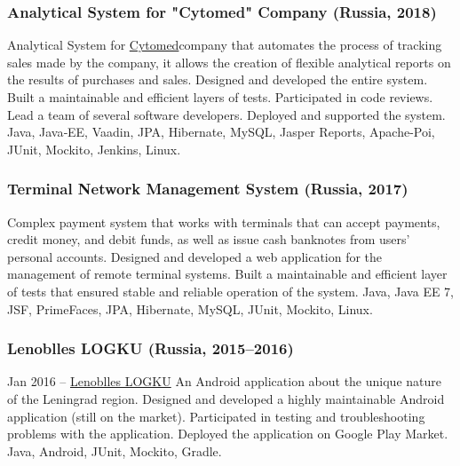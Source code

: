 \documentclass{vl}
\begin{document}
    \subsubsection*{Analytical System for "Cytomed" Company (Russia, 2018)}
    Analytical System for \href{https://cytomed.ru/en/}{Cytomed}company that automates the process of tracking sales
    made by the company, it allows the creation of flexible analytical reports on the results of purchases and sales.
    Designed and developed the entire system.
    Built a maintainable and efficient layers of tests.
    Participated in code reviews.
    Lead a team of several software developers.
    Deployed and supported the system.
    Java, Java‐EE, Vaadin, JPA, Hibernate, MySQL, Jasper Reports, Apache-Poi, JUnit, Mockito, Jenkins, Linux.

    \subsubsection*{Terminal Network Management System (Russia, 2017)}
    Complex payment system that works with terminals that can accept payments, credit money, and debit funds,
    as well as issue cash banknotes from users' personal accounts.
    Designed and developed a web application for the management of remote terminal systems.
    Built a maintainable and efficient layer of tests that ensured stable and reliable operation of the system.
    Java, Java EE 7, JSF, PrimeFaces, JPA, Hibernate, MySQL, JUnit, Mockito, Linux.

    \subsubsection*{Lenoblles LOGKU (Russia, 2015--2016)}
    Jan 2016 – \href{https://play.google.com/store/apps/details?id=com.altinntech.oopt_lo}{Lenoblles LOGKU}
    An Android application about the unique nature of the Leningrad region.
    Designed and developed a highly maintainable Android application (still on the market).
    Participated in testing and troubleshooting problems with the application.
    Deployed the application on Google Play Market.
    Java, Android, JUnit, Mockito, Gradle.
\end{document}
